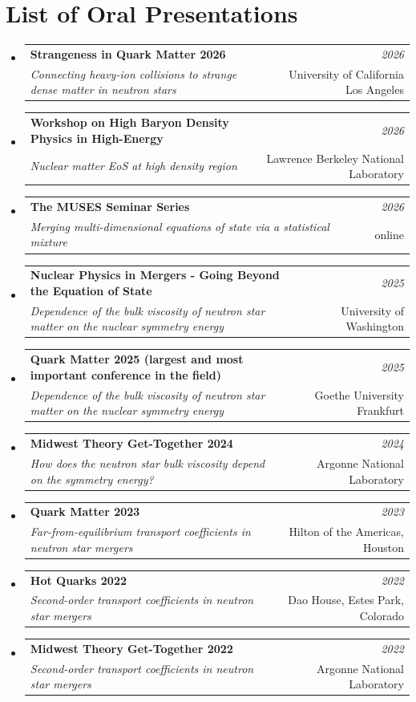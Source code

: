 \documentclass[a4paper,11pt]{article}
\makeatletter
\newcommand{\resumeSubheading}[4]{
\vspace{0.5mm}\item
    \begin{tabular*}{0.98\textwidth}[t]{l@{\extracolsep{\fill}}r}
        \textbf{#1} & \textit{\footnotesize{#4}} \\
        \textit{\footnotesize{#3}} &  \footnotesize{#2}\\
    \end{tabular*}
    \vspace{-2.4mm}
}
\newcommand{\resumeSubHeadingListStart}{\begin{itemize}[leftmargin=*,labelsep=1mm]}
\newcommand{\resumeSubHeadingListEnd}{\end{itemize}\vspace{2mm}}
\makeatother
\begin{document}















\section{\textbf{List of Oral Presentations}}
\vspace{0.2mm}
  \resumeSubHeadingListStart
  \resumeSubheading
    {Strangeness in Quark Matter 2026}{University of California Los Angeles}
      {Connecting heavy-ion collisions to strange dense matter in neutron stars}{2026}
      \vspace{0.4mm}
  \resumeSubheading
    {Workshop on High Baryon Density Physics in High-Energy}{Lawrence Berkeley National Laboratory}
      {Nuclear matter EoS at high density region}{2026}
      \vspace{0.4mm}
  \resumeSubheading
    {The MUSES Seminar Series}{online}
      {Merging multi-dimensional equations of state via a statistical mixture}{2026}
      \vspace{0.4mm}
  \resumeSubheading
    {Nuclear Physics in Mergers - Going Beyond the Equation of State}{University of Washington}
      {Dependence of the bulk viscosity of neutron star matter on the nuclear symmetry energy}{2025}
      \vspace{0.4mm}
  \resumeSubheading
    {Quark Matter 2025 (largest and most important conference in the field)}{Goethe University Frankfurt}
      {Dependence of the bulk viscosity of neutron star matter on the nuclear symmetry energy}{2025}
      \vspace{0.4mm}
  \resumeSubheading
    {Midwest Theory Get-Together 2024}{Argonne National Laboratory}
      {How does the neutron star bulk viscosity depend on the symmetry energy?}{2024}
      \vspace{0.4mm}
  \resumeSubheading
    {Quark Matter 2023}{Hilton of the Americas, Houston}
      {Far-from-equilibrium transport coefficients in neutron star mergers}{2023}
      \vspace{0.4mm}
  \resumeSubheading
    {Hot Quarks 2022}{Dao House, Estes Park, Colorado}
      {Second-order transport coefficients in neutron star mergers}{2022}
      \vspace{0.4mm}
  \resumeSubheading
    {Midwest Theory Get-Together 2022}{Argonne National Laboratory}
      {Second-order transport coefficients in neutron star mergers}{2022}
      \vspace{0.4mm}
  \resumeSubHeadingListEnd
\end{document}
